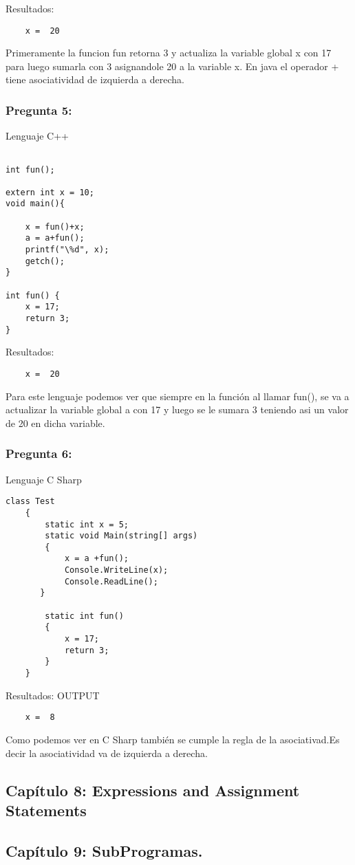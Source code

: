 \documentclass[11pt]{article}
\begin{document}
\noindent Resultados:
\begin{verbatim}
	x =  20
\end{verbatim}

Primeramente la funcion fun retorna 3 y actualiza la variable global x con 17 para luego sumarla con 3 asignandole 20 a la variable x.
En java el operador + tiene asociatividad de izquierda a derecha.

\subsubsection{Pregunta 5:}

Lenguaje C++

\begin{lstlisting}[frame=single] 

int fun();

extern int x = 10;
void main(){
	
	x = fun()+x;
	a = a+fun();
	printf("\%d", x);
	getch();
}

int fun() {
	x = 17;
	return 3;
}
\end{lstlisting}

\noindent Resultados:
\begin{verbatim}
	x =  20
\end{verbatim}

Para este lenguaje podemos ver que siempre en la función al llamar fun(), se va a actualizar la variable global a con 17 y luego se le sumara 3 teniendo asi un valor de 20 en dicha variable.


\subsubsection{Pregunta 6:}
Lenguaje C Sharp

\begin{lstlisting}[frame=single]
class Test
    {
        static int x = 5;
        static void Main(string[] args)
        {
            x = a +fun();
            Console.WriteLine(x);
            Console.ReadLine();
       }

        static int fun()
        {
            x = 17;
            return 3;
        }
    }
\end{lstlisting}

\noindent Resultados:
OUTPUT\\
\begin{verbatim}
	x =  8
\end{verbatim}

Como podemos ver en C Sharp también se cumple la regla de la asociativad.Es decir la asociatividad va de izquierda a derecha.


\subsection{Capítulo 8: Expressions and Assignment Statements}

\subsection{Capítulo 9: SubProgramas.}


        
\end{document}
